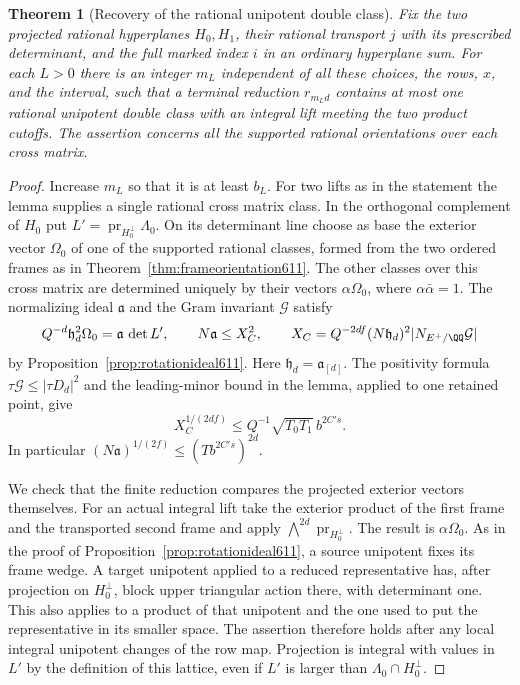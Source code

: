 \documentclass[a4paper,11pt]{article}
\newtheorem{theorem}[proposition]{Theorem}
\theoremstyle{definition}
\theoremstyle{remark}
\numberwithin{equation}{section}
\begin{document}
\begin{theorem}[Recovery of the rational unipotent double class]
\leavevmode\label{thm:terminalclass640}
Fix the two projected rational hyperplanes \(H_0,H_1\), their
rational transport \(j\) with its prescribed determinant, and
the full marked index \(i\) in an ordinary hyperplane sum.
For each \(L>0\) there is an integer \(m_L\) independent of all
these choices, the rows, \(x\), and the interval, such that a
terminal reduction \(r_{m_L d}\) contains at most one rational
unipotent double class with an integral lift meeting the two
product cutoffs. The assertion concerns all the supported
rational orientations over each cross matrix.
\end{theorem}
\begin{proof}
Increase \(m_L\) so that it is at least \(b_L\). For two lifts
as in the statement the lemma supplies a single rational cross
matrix class. In the orthogonal complement of \(H_0\) put
\(L'=\operatorname{pr}_{H_0^\perp}\Lambda_0\). On its
determinant line choose as base the exterior vector \(\Omega_0\)
of one of the supported rational classes, formed from the two
ordered frames as in Theorem~\ref{thm:frameorientation611}.
The other classes over this cross matrix are determined uniquely
by their vectors \(\alpha\Omega_0\), where
\(\alpha\bar\alpha=1\). The normalizing ideal
\(\mathfrak a\) and the Gram invariant \(\mathcal G\) satisfy
\[
 Q^{-d}\mathfrak h_d^2\Omega_0=\mathfrak a\,\det L',
 \qquad
 N\mathfrak a\le X_C^2,\qquad
 X_C=Q^{-2df}(N\mathfrak h_d)^2|N_{E^+/\QQ}\mathcal G|
\]
by Proposition~\ref{prop:rotationideal611}.
Here \(\mathfrak h_d=\mathfrak a_{[d]}\).
The positivity formula
\(\tau\mathcal G\le|\tau D_d|^2\) and the leading-minor bound
in the lemma, applied to one retained point, give
\[
 X_C^{1/(2df)}\le
             Q^{-1}\sqrt{T_0T_1}\,b^{2C's}.
\]
In particular \((N\mathfrak a)^{1/(2f)}
                     \le (T b^{2C's})^{2d}\).

We check that the finite reduction compares the projected
exterior vectors themselves. For an actual integral lift take
the exterior product of the first frame and the transported
second frame and apply \(\bigwedge^{2d}\operatorname{pr}_{H_0^\perp}\).
The result is \(\alpha\Omega_0\). As in the proof of
Proposition~\ref{prop:rotationideal611}, a source unipotent
fixes its frame wedge. A target unipotent applied to a reduced
representative has, after projection on \(H_0^\perp\), block
upper triangular action there, with determinant one. This also
applies to a product of that unipotent and the one used to put
the representative in its smaller space. The assertion therefore
holds after any local integral unipotent changes of the row map.
Projection is integral with values in \(L'\) by the definition
of this lattice, even if \(L'\) is larger than
\(\Lambda_0\cap H_0^\perp\).


\end{proof}
\end{document}
